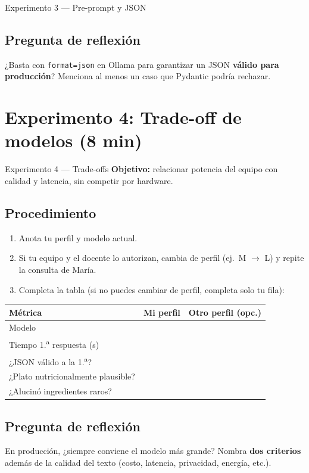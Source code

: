 \documentclass[12pt,a4paper]{article}
\begin{document}
\begin{experbox}{Experimento 3 --- Pre-prompt y JSON}
\subsection*{Pregunta de reflexión}
¿Basta con \texttt{format=json} en Ollama para garantizar un JSON \textbf{válido
para producción}? Menciona al menos un caso que Pydantic podría rechazar.
\end{experbox}

\section{Experimento 4: Trade-off de modelos (8 min)}

\begin{experbox}{Experimento 4 --- Trade-offs}
\textbf{Objetivo:} relacionar potencia del equipo con calidad y latencia, sin
competir por hardware.

\subsection*{Procedimiento}
\begin{enumerate}[noitemsep]
  \item Anota tu perfil y modelo actual.
  \item Si tu equipo y el docente lo autorizan, cambia de perfil (ej.\ M $\rightarrow$ L)
        y repite la consulta de María.
  \item Completa la tabla (si no puedes cambiar de perfil, completa solo tu fila):
\end{enumerate}

\begin{table}[h]
\centering
\small
\begin{tabular}{@{}lcc@{}}
\toprule
\textbf{Métrica} & \textbf{Mi perfil} & \textbf{Otro perfil (opc.)} \\
\midrule
Modelo & & \\[1.2ex]
Tiempo 1.\textsuperscript{a} respuesta (s) & & \\[1.2ex]
¿JSON válido a la 1.\textsuperscript{a}? & & \\[1.2ex]
¿Plato nutricionalmente plausible? & & \\[1.2ex]
¿Alucinó ingredientes raros? & & \\
\bottomrule
\end{tabular}
\end{table}

\subsection*{Pregunta de reflexión}
En producción, ¿siempre conviene el modelo más grande? Nombra \textbf{dos criterios}
además de la calidad del texto (costo, latencia, privacidad, energía, etc.).
\end{experbox}
\end{document}
